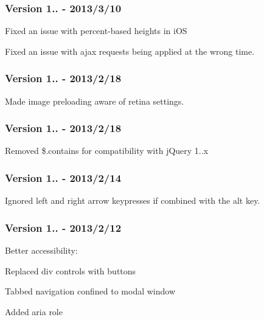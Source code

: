 \subsubsection*{Version 1.. -\/ 2013/3/10}


\begin{DoxyItemize}
\item Fixed an issue with percent-\/based heights in i\-O\-S
\item Fixed an issue with ajax requests being applied at the wrong time.
\end{DoxyItemize}

\subsubsection*{Version 1.. -\/ 2013/2/18}


\begin{DoxyItemize}
\item Made image preloading aware of retina settings.
\end{DoxyItemize}

\subsubsection*{Version 1.. -\/ 2013/2/18}


\begin{DoxyItemize}
\item Removed \$.contains for compatibility with j\-Query 1..\-x
\end{DoxyItemize}

\subsubsection*{Version 1.. -\/ 2013/2/14}


\begin{DoxyItemize}
\item Ignored left and right arrow keypresses if combined with the alt key.
\end{DoxyItemize}

\subsubsection*{Version 1.. -\/ 2013/2/12}


\begin{DoxyItemize}
\item Better accessibility\-:
\begin{DoxyItemize}
\item Replaced div controls with buttons
\item Tabbed navigation confined to modal window
\item Added aria role
\end{DoxyItemize}
\end{DoxyItemize}

